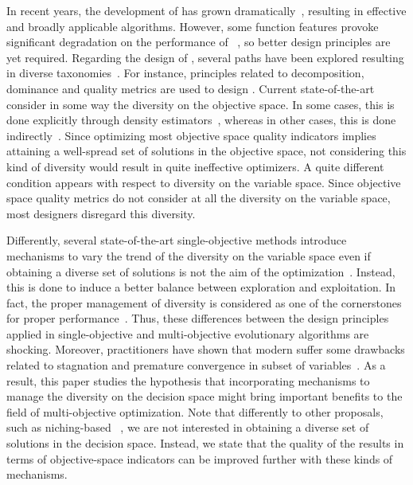 %
In recent years, the development of \MOEAS{} has grown dramatically~\cite{van1998multiobjective, coello2007mop}, resulting 
in effective and broadly applicable algorithms.
%
However, some function features provoke significant degradation on the performance of \MOEAS{}~\cite{huband2006review}, 
so better design principles are yet required.
%
Regarding the design of \MOEAS{}, several paths have been explored resulting in diverse taxonomies~\cite{trivedi2016survey}.
%
For instance, principles related to decomposition, dominance and quality metrics are used
to design \MOEAS{}.
%
Current state-of-the-art \MOEAS{} consider in some way the diversity on the objective space.
%
In some cases, this is done explicitly through density estimators~\cite{beume2007sms}, %
whereas in other cases,
this is done indirectly~\cite{zhang2007moea}. 
%
Since optimizing most objective space quality indicators implies attaining a well-spread set of solutions in the
objective space, not considering this kind of diversity would result in quite ineffective optimizers.
%
A quite different condition appears with respect to diversity on the variable space.
%
Since objective space quality metrics do not consider at all the diversity on the variable space,
most \MOEAS{} designers disregard this diversity.

Differently, %
several state-of-the-art single-objective methods introduce mechanisms to vary the trend of the 
diversity on the variable space even if obtaining a diverse
set of solutions is not the aim of the optimization~\cite{Joel:Crepinsek}.
%
Instead, this is done to induce a better balance between exploration and exploitation.
%
In fact, the proper management of diversity is considered as one of the cornerstones for proper performance~\cite{Herrera-Poyatos:17}.
%
Thus, these differences between the design principles applied in single-objective and multi-objective evolutionary 
algorithms are shocking.
%
Moreover, practitioners have shown that modern \MOEAS{} suffer some drawbacks related to stagnation and premature 
convergence in subset of variables~\cite{ishibuchi2006comparison, castillo2017multi, buche2003self, lu2002dynamic}.
%
As a result, this paper studies the hypothesis that incorporating mechanisms to manage the diversity on the decision space 
might bring important benefits to the field of multi-objective optimization.
%
Note that differently to other proposals, such as niching-based \MOEAS{}~\cite{mahfoud1995niching, srinivas1994muiltiobjective}, we are not interested in obtaining
a diverse set of solutions in the decision space.
%
Instead, we state that the quality of the results in terms of objective-space indicators can be improved further with these
kinds of mechanisms.

